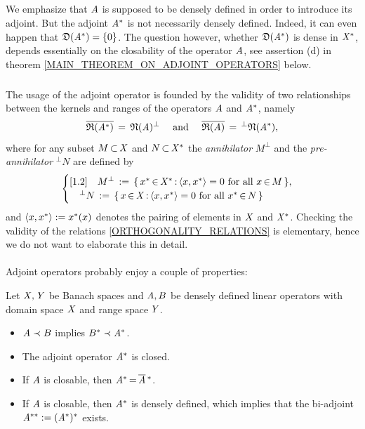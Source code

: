 \documentclass[11pt,twoside]{article}
\begin{document}
\subparagraph{}
We emphasize that
$\mathit{A}$ is supposed to be densely defined in order to introduce its adjoint.
But the adjoint $\mathit{A}^*$ is not necessarily densely defined.
Indeed,
it can even happen that $\mathfrak{D}(\mathit{A}^*) = \{0\}$.
The question however,
whether $\mathfrak{D}(\mathit{A}^*)$ is dense in $\mathit{X}^*$,
depends essentially on the closability of the operator $\mathit{A}$,
see assertion (d) in theorem \ref{MAIN_THEOREM_ON_ADJOINT_OPERATORS} below.

\subparagraph{} %
The usage of the adjoint operator is founded by the validity
of two relationships between the kernels and ranges
of the operators $\mathit{A}$ and $\mathit{A}^*$,
namely
\begin{equation}\label{ORTHOGONALITY_RELATIONS}
\overline{\mathfrak{R}(\mathit{A}^*) } \,=\, \mathfrak{N}(\mathit{A})^{\bot}
\quad \mbox{ and } \quad
\overline{\mathfrak{R}(\mathit{A}) } \,=\, ^{\bot}\mathfrak{N}(\mathit{A}^*),
\end{equation}
where for any subset $M {\,\subset\,} \mathit{X}$ and $N {\,\subset\,} \mathit{X}^*$
the \textit{annihilator}     $M^{\bot}$ and
the \textit{pre-annihilator} $^{\bot}N$
are defined by
\[
\begin{cases}[1.2]
\quad M^{\bot} \,:=\, \{\,x^*{\,\in\,} \mathit{X}^* {\,:\,} \langle x,x^* \rangle = 0
      \mbox{ for all } x   {\,\in\,} M \,\},\\
\quad ^{\bot}N \,:=\, \{\,x  {\,\in\,} \mathit{X}   {\,:\,} \langle x,x^* \rangle = 0
      \mbox{ for all } x^* {\,\in\,} N \,\}\\
\end{cases}
\]
and $\langle x,x^* \rangle := x^*(x)$ denotes the pairing of elements in $\mathit{X}$
and $\mathit{X}^*$.
Checking the validity of the relations \eqref{ORTHOGONALITY_RELATIONS}
is elementary,
hence we do not want to elaborate this in detail.

\paragraph{} %
Adjoint operators probably enjoy a couple of properties:

\begin{theorem}\label{MAIN_THEOREM_ON_ADJOINT_OPERATORS}
Let $\mathit{X},\mathit{Y}$ be Banach spaces and
$\mathit{A},{B}$ be densely defined linear operators with domain space
$\mathit{X}$ and range space\,$\mathit{Y}$.

\begin{itemize}[leftmargin=9mm]
\item[(a)] $\mathit{A} \prec {B}$ implies ${B}^* \prec \mathit{A}^*$.
\item[(b)] The adjoint operator $\mathit{A}^*$ is closed.
\item[(c)] If $\mathit{A}$ is closable, then $\mathit{A}^* {\,=\,} \overline{\mathit{A}}\,^*$.
\item[(d)] If $\mathit{A}$ is closable, then $\mathit{A}^*$ is densely defined,
           which implies that
           the bi-adjoint $\mathit{A}^{**} := (\mathit{A}^*)^*$ exists.
\end{itemize}
\end{theorem}
\end{document}
